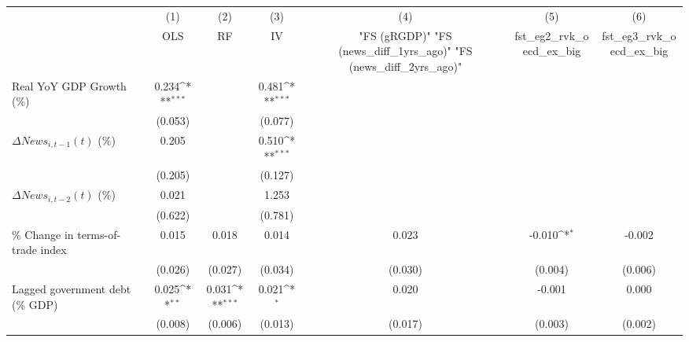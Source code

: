 {
\def\sym#1{\ifmmode^{#1}\else\(^{#1}\)\fi}
\begin{tabular}{l*{6}{c}}
\toprule
                    &\multicolumn{1}{c}{(1)}&\multicolumn{1}{c}{(2)}&\multicolumn{1}{c}{(3)}&\multicolumn{1}{c}{(4)}&\multicolumn{1}{c}{(5)}&\multicolumn{1}{c}{(6)}\\
                    &\multicolumn{1}{c}{OLS}&\multicolumn{1}{c}{RF}&\multicolumn{1}{c}{IV}&\multicolumn{1}{c}{ "FS (gRGDP)"  "FS (news_diff_1yrs_ago)"  "FS (news_diff_2yrs_ago)" }&\multicolumn{1}{c}{fst_eg2_rvk_oecd_ex_big}&\multicolumn{1}{c}{fst_eg3_rvk_oecd_ex_big}\\
\midrule
Real YoY GDP Growth (\%)&       0.234\sym{***}&                     &       0.481\sym{***}&                     &                     &                     \\
                    &     (0.053)         &                     &     (0.077)         &                     &                     &                     \\
\addlinespace
$ \Delta News_{i,t-1}(t)$ (\%)&       0.205         &                     &       0.510\sym{***}&                     &                     &                     \\
                    &     (0.205)         &                     &     (0.127)         &                     &                     &                     \\
\addlinespace
$ \Delta News_{i,t-2}(t)$ (\%)&       0.021         &                     &       1.253         &                     &                     &                     \\
                    &     (0.622)         &                     &     (0.781)         &                     &                     &                     \\
\addlinespace
\% Change in terms-of-trade index&       0.015         &       0.018         &       0.014         &       0.023         &      -0.010\sym{*}  &      -0.002         \\
                    &     (0.026)         &     (0.027)         &     (0.034)         &     (0.030)         &     (0.004)         &     (0.006)         \\
\addlinespace
Lagged government debt (\% GDP)&       0.025\sym{**} &       0.031\sym{***}&       0.021\sym{*}  &       0.020         &      -0.001         &       0.000         \\
                    &     (0.008)         &     (0.006)         &     (0.013)         &     (0.017)         &     (0.003)         &     (0.002)         \\

\end{tabular}}
